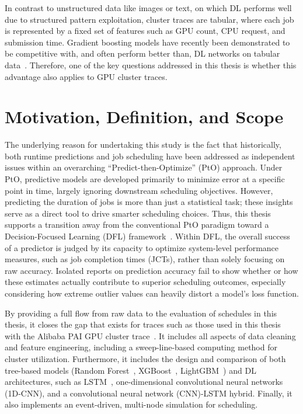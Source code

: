 \clearpage
In contrast to unstructured data like images or text, on which DL performs well due to structured pattern exploitation, cluster traces are tabular, where each job is represented by a fixed set of features such as GPU count, CPU request, and submission time. Gradient boosting models have recently been demonstrated to be competitive with, and often perform better than, DL networks on tabular data~\cite{shwartzziv2022tabular}. Therefore, one of the key questions addressed in this thesis is whether this advantage also applies to GPU cluster traces.

\section{Motivation, Definition, and Scope}

The underlying reason for undertaking this study is the fact that historically, both runtime predictions and job scheduling have been addressed as independent issues within an overarching ``Predict-then-Optimize'' (PtO) approach. Under PtO, predictive models are developed primarily to minimize error at a specific point in time, largely ignoring downstream scheduling objectives. However, predicting the duration of jobs is more than just a statistical task; these insights serve as a direct tool to drive smarter scheduling choices. Thus, this thesis supports a transition away from the conventional PtO paradigm toward a Decision-Focused Learning (DFL) framework~\cite{mandi2023decision}. Within DFL, the overall success of a predictor is judged by its capacity to optimize system-level performance measures, such as job completion times (JCTs), rather than solely focusing on raw accuracy. Isolated reports on prediction accuracy fail to show whether or how these estimates actually contribute to superior scheduling outcomes, especially considering how extreme outlier values can heavily distort a model's loss function.

By providing a full flow from raw data to the evaluation of schedules in this thesis, it closes the gap that exists for traces such as those used in this thesis with the Alibaba PAI GPU cluster trace~\cite{weng2022mlaas}. It includes all aspects of data cleaning and feature engineering, including a sweep-line-based computing method for cluster utilization. Furthermore, it includes the design and comparison of both tree-based models (Random Forest~\cite{breiman2001random}, XGBoost~\cite{chen2016xgboost}, LightGBM~\cite{ke2017lightgbm}) and DL architectures, such as LSTM~\cite{hochreiter1997long}, one-dimensional convolutional neural networks (1D-CNN), and a convolutional neural network (CNN)-LSTM hybrid. Finally, it also implements an event-driven, multi-node simulation for scheduling.

